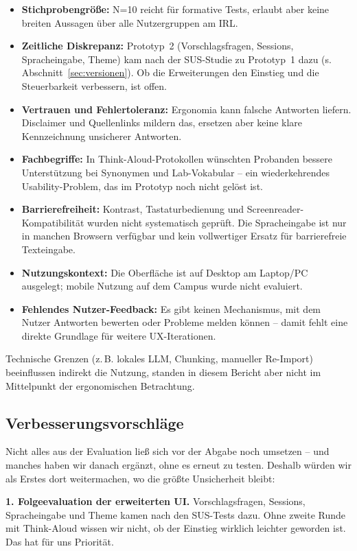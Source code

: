 \begin{itemize}
    \item \textbf{Stichprobengröße:} N=10 reicht für formative Tests, erlaubt aber keine breiten Aussagen über alle Nutzergruppen am IRL.
    \item \textbf{Zeitliche Diskrepanz:} Prototyp~2 (Vorschlagsfragen, Sessions, Spracheingabe, Theme) kam nach der SUS-Studie zu Prototyp~1 dazu (s.\,Abschnitt~\ref{sec:versionen}). Ob die Erweiterungen den Einstieg und die Steuerbarkeit verbessern, ist offen.
    \item \textbf{Vertrauen und Fehlertoleranz:} Ergonomia kann falsche Antworten liefern. Disclaimer und Quellenlinks mildern das, ersetzen aber keine klare Kennzeichnung unsicherer Antworten.
    \item \textbf{Fachbegriffe:} In Think-Aloud-Protokollen wünschten Probanden bessere Unterstützung bei Synonymen und Lab-Vokabular -- ein wiederkehrendes Usability-Problem, das im Prototyp noch nicht gelöst ist.
    \item \textbf{Barrierefreiheit:} Kontrast, Tastaturbedienung und Screenreader-Kompatibilität wurden nicht systematisch geprüft. Die Spracheingabe ist nur in manchen Browsern verfügbar und kein vollwertiger Ersatz für barrierefreie Texteingabe.
    \item \textbf{Nutzungskontext:} Die Oberfläche ist auf Desktop am Laptop/PC ausgelegt; mobile Nutzung auf dem Campus wurde nicht evaluiert.
    \item \textbf{Fehlendes Nutzer-Feedback:} Es gibt keinen Mechanismus, mit dem Nutzer Antworten bewerten oder Probleme melden können -- damit fehlt eine direkte Grundlage für weitere UX-Iterationen.
\end{itemize}

\noindent Technische Grenzen (z.\,B. lokales LLM, Chunking, manueller Re-Import) beeinflussen indirekt die Nutzung, standen in diesem Bericht aber nicht im Mittelpunkt der ergonomischen Betrachtung.

\subsection{Verbesserungsvorschläge}

Nicht alles aus der Evaluation ließ sich vor der Abgabe noch umsetzen -- und manches haben wir danach ergänzt, ohne es erneut zu testen. Deshalb würden wir als Erstes dort weitermachen, wo die größte Unsicherheit bleibt:

\textbf{1. Folgeevaluation der erweiterten UI.} Vorschlagsfragen, Sessions, Spracheingabe und Theme kamen nach den SUS-Tests dazu. Ohne zweite Runde mit Think-Aloud wissen wir nicht, ob der Einstieg wirklich leichter geworden ist. Das hat für uns Priorität.

